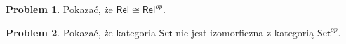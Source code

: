 \documentclass[10pt]{amsart}
\theoremstyle{plain}
\theoremstyle{definition}
\newtheorem{problem}{Problem}
\numberwithin{equation}{section}
\begin{document}
\begin{problem}
Pokazać, że $\mathsf{Rel}\cong \mathsf{Rel}^{op}$. 
\end{problem}


\begin{problem}
Pokazać, że kategoria $\mathsf{Set}$ nie jest izomorficzna z kategorią $\mathsf{Set}^{op}$. 
\end{problem}
%
%
%
%
%
%
%
%
\end{document}
